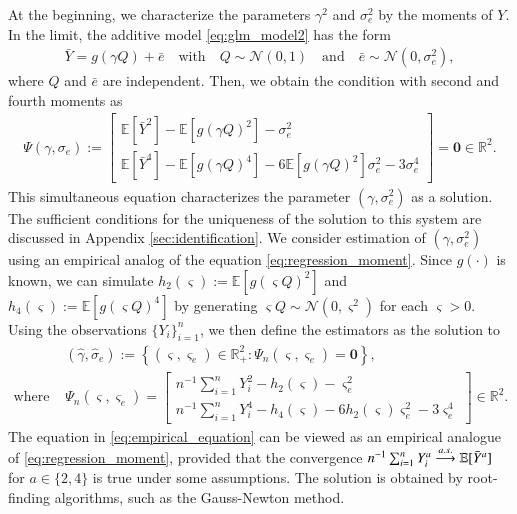 \documentclass[12pt,reqno]{amsart}
\newcommand{\R}{\mathbb{R}}
\newcommand{\E}{\mathbb{E}}
\newcommand{\cc}{\color{black}}
\renewcommand{\hat}{\widehat}
\def\bzero{\bm{0}}
\begin{document}
At the beginning, we characterize the parameters $\gamma^2$ and $\sigma_{{e}}^2$ by the moments of $Y$.
In the limit, the additive model \eqref{eq:glm_model2} has the form
\begin{align}
\label{eq:limit-additive}
    \bar{Y} = g
    (\gamma Q) + \bar{e} \quad \text{with}\quad Q \sim \mathcal{N}(0, 1) \quad \text{and}\quad \bar{e} \sim \mathcal{N}(0, \sigma^2_e),
\end{align}
where $Q$ and $\bar{e}$ are independent.
Then, we obtain the condition with second and fourth moments as
\begin{align} \label{eq:regression_moment}
    \Psi(\gamma,\sigma_e):=
    \begin{bmatrix}
    \E[\bar{Y}^2] - \E[g(\gamma Q)^2] - \sigma_e^2 \\ 
    \E[\bar{Y}^4] - \E[g(\gamma Q)^4] - 6 \E[g(\gamma Q)^2] \sigma_e^2 - 3\sigma_e^4
    \end{bmatrix}
    =\bzero\in\R^2.
\end{align}
This simultaneous equation characterizes the parameter $(\gamma, \sigma_e^2)$ as a solution.
{\cc
The sufficient conditions for the uniqueness of the solution to this system are discussed in Appendix \ref{sec:identification}. 
}
We consider estimation of $(\gamma, \sigma_e^2)$ using an empirical analog of the equation \eqref{eq:regression_moment}.
Since $g(\cdot)$ is known, we can simulate $h_2 (\varsigma) := \E[g({\varsigma Q})^2]$ and $h_4 (\varsigma) := \E[g({\varsigma Q})^4]$ by generating ${\varsigma Q}\sim \mathcal{N}(0,\varsigma^2)$ for each $\varsigma>0$. 
Using the observations $\{Y_i\}_{i=1}^n$, we then define the estimators as the solution to
\begin{align} \label{eq:empirical_equation}
&(\hat{\gamma}, \hat{\sigma}_e) := \left\{ (\varsigma, \varsigma_e) \in \mathbb{R}_+^2 : \Psi_n(\varsigma,\varsigma_e)=\bzero
\right\},\\
\mbox{where~}&\Psi_n(\varsigma,\varsigma_e)=
\begin{bmatrix}
        n^{-1} \sum_{i=1}^n Y_i^2 -  h_2(\varsigma) - \varsigma_e^2 \\
        n^{-1} \sum_{i=1}^n Y_i^4 - h_4(\varsigma) - 6 h_2(\varsigma) \varsigma_e^2 - 3 \varsigma_e^4
\end{bmatrix}
\in\R^2.
\end{align}
The equation in \eqref{eq:empirical_equation} can be viewed as an empirical analogue of \eqref{eq:regression_moment}, provided that the convergence $n^{-1} \sum_{i=1}^n Y_i^a \overset{\rm a.s.}{\longrightarrow} \E[\bar{Y}^a]$ for $a \in \{2,4\}$ is true under some assumptions. 
The solution is obtained by root-finding algorithms, such as the Gauss-Newton method.
\end{document}
